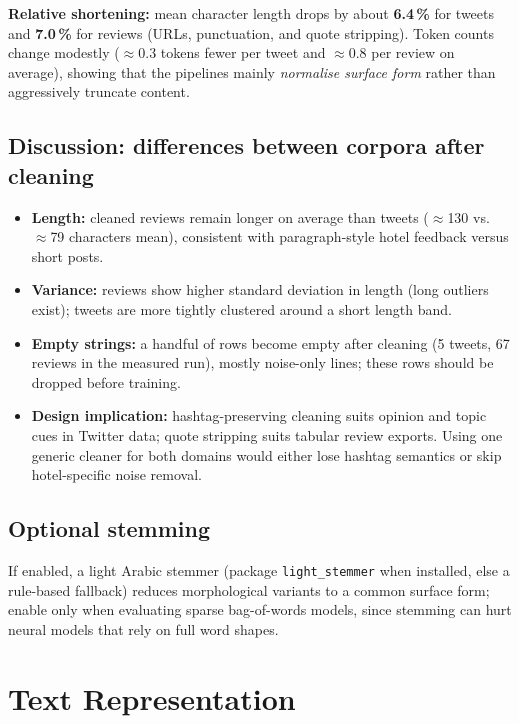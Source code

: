 \documentclass[11pt,a4paper]{report}
\begin{document}
\noindent
\textbf{Relative shortening:} mean character length drops by about \textbf{6.4\,\%} for tweets and \textbf{7.0\,\%} for reviews (URLs, punctuation, and quote stripping). Token counts change modestly ($\approx$0.3 tokens fewer per tweet and $\approx$0.8 per review on average), showing that the pipelines mainly \textit{normalise surface form} rather than aggressively truncate content.

\section{Discussion: differences between corpora after cleaning}

\begin{itemize}[noitemsep]
    \item \textbf{Length:} cleaned reviews remain longer on average than tweets ($\approx$130 vs.\ $\approx$79 characters mean), consistent with paragraph-style hotel feedback versus short posts.
    \item \textbf{Variance:} reviews show higher standard deviation in length (long outliers exist); tweets are more tightly clustered around a short length band.
    \item \textbf{Empty strings:} a handful of rows become empty after cleaning (5 tweets, 67 reviews in the measured run), mostly noise-only lines; these rows should be dropped before training.
    \item \textbf{Design implication:} hashtag-preserving cleaning suits opinion and topic cues in Twitter data; quote stripping suits tabular review exports. Using one generic cleaner for both domains would either lose hashtag semantics or skip hotel-specific noise removal.
\end{itemize}

\section{Optional stemming}

If enabled, a light Arabic stemmer (package \texttt{light\_stemmer} when installed, else a rule-based fallback) reduces morphological variants to a common surface form; enable only when evaluating sparse bag-of-words models, since stemming can hurt neural models that rely on full word shapes.

\chapter{Text Representation}
\end{document}
